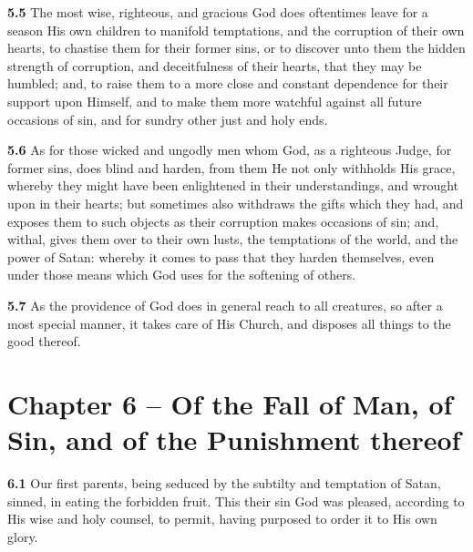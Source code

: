 \par\textbf{5.5} The most wise, righteous, and gracious God does oftentimes leave for a season His own children to manifold temptations, and the corruption of their own hearts, to chastise them for their former sins, or to discover unto them the hidden strength of corruption, and deceitfulness of their hearts, that they may be humbled; and, to raise them to a more close and constant dependence for their support upon Himself, and to make them more watchful against all future occasions of sin, and for sundry other just and holy ends.   

\par\textbf{5.6} As for those wicked and ungodly men whom God, as a righteous Judge, for former sins, does blind and harden, from them He not only withholds His grace, whereby they might have been enlightened in their understandings, and wrought upon in their hearts; but sometimes also withdraws the gifts which they had, and exposes them to such objects as their corruption makes occasions of sin; and, withal, gives them over to their own lusts, the temptations of the world, and the power of Satan: whereby it comes to pass that they harden themselves, even under those means which God uses for the softening of others.   

\par\textbf{5.7} As the providence of God does in general reach to all creatures, so after a most special manner, it takes care of His Church, and disposes all things to the good thereof.

\section{Chapter 6 -- Of the Fall of Man, of Sin, and of the Punishment thereof}

\par\textbf{6.1} Our first parents, being seduced by the subtilty and temptation of Satan, sinned, in eating the forbidden fruit. This their sin God was pleased, according to His wise and holy counsel, to permit, having purposed to order it to His own glory.   

